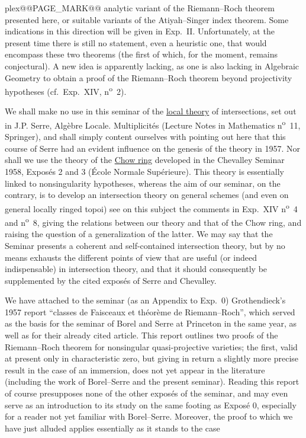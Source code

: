 plex@@PAGE_MARK@@ analytic variant of the Riemann--Roch theorem presented here, or suitable variants of the Atiyah--Singer index theorem. Some indications in this direction will be given in Exp.\ II. Unfortunately, at the present time there is still no statement, even a heuristic one, that would encompass these two theorems (the first of which, for the moment, remains conjectural). A new idea is apparently lacking, as one is also lacking in Algebraic Geometry to obtain a proof of the Riemann--Roch theorem beyond projectivity hypotheses (cf.\ Exp.\ XIV, n\textsuperscript{o}~2).

We shall make no use in this seminar of the \underline{local theory} of intersections, set out in J.P. Serre, Algèbre Locale. Multiplicités (Lecture Notes in Mathematics n\textsuperscript{o}~11, Springer), and shall simply content ourselves with pointing out here that this course of Serre had an evident influence on the genesis of the theory in 1957. Nor shall we use the theory of the \underline{Chow ring} developed in the Chevalley Seminar 1958, Exposés 2 and 3 (École Normale Supérieure). This theory is essentially linked to nonsingularity hypotheses, whereas the aim of our seminar, on the contrary, is to develop an intersection theory on general schemes (and even on general locally ringed topoi) see on this subject the comments in Exp.\ XIV n\textsuperscript{o}~4 and n\textsuperscript{o}~8, giving the relations between our theory and that of the Chow ring, and raising the question of a generalization of the latter. We may say that the Seminar presents a coherent and self-contained intersection theory, but by no means exhausts the different points of view that are useful (or indeed indispensable) in intersection theory, and that it should consequently be supplemented by the cited exposés of Serre and Chevalley.

We have attached to the seminar (as an Appendix to Exp.\ 0) Grothendieck's 1957 report ``classes de Faisceaux et théorème de Riemann--Roch'', which served as the basis for the seminar of Borel and Serre at Princeton in the same year, as well as for their already cited article. This report outlines two proofs of the Riemann--Roch theorem for nonsingular quasi-projective varieties; the first, valid at present only in characteristic zero, but giving in return a slightly more precise result in the case of an immersion, does not yet appear in the literature (including the work of Borel--Serre and the present seminar). Reading this report of course presupposes none of the other exposés of the seminar, and may even serve as an introduction to its study on the same footing as Exposé 0, especially for a reader not yet familiar with Borel--Serre. Moreover, the proof to which we have just alluded applies essentially as it stands to the case

